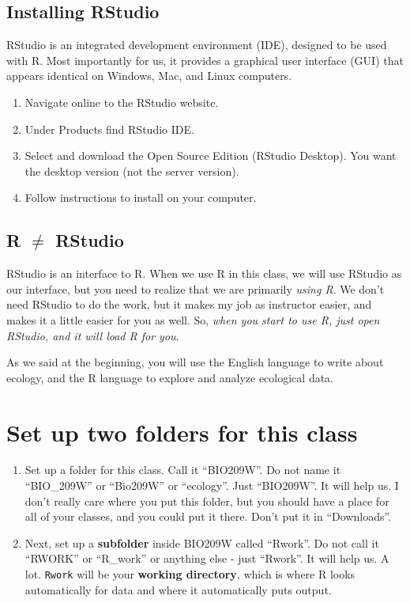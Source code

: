 \documentclass[
  letterpaper,
  DIV=11,
  numbers=noendperiod]{scrreprt}
\providecommand{\tightlist}{%
  \setlength{\itemsep}{0pt}\setlength{\parskip}{0pt}}
\begin{document}
\subsection{Installing RStudio}\label{installing-rstudio}

RStudio is an integrated development environment (IDE), designed to be
used with R. Most importantly for us, it provides a graphical user
interface (GUI) that appears identical on Windows, Mac, and Linux
computers.

\begin{enumerate}
\def\labelenumi{\arabic{enumi}.}
\tightlist
\item
  Navigate online to the RStudio website.
\item
  Under Products find RStudio IDE.
\item
  Select and download the Open Source Edition (RStudio Desktop). You
  want the desktop version (not the server version).
\item
  Follow instructions to install on your computer.
\end{enumerate}

\subsection{\texorpdfstring{R \(\neq\)
RStudio}{R \textbackslash neq RStudio}}\label{r-neq-rstudio}

RStudio is an interface to R. When we use R in this class, we will use
RStudio as our interface, but you need to realize that we are primarily
\emph{using R}. We don't need RStudio to do the work, but it makes my
job as instructor easier, and makes it a little easier for you as well.
So, \emph{when you start to use R, just open RStudio, and it will load R
for you}.

As we said at the beginning, you will use the English language to write
about ecology, and the R language to explore and analyze ecological
data.

\section{Set up two folders for this
class}\label{set-up-two-folders-for-this-class}

\begin{enumerate}
\def\labelenumi{\arabic{enumi}.}
\item
  Set up a folder for this class. Call it ``BIO209W''. Do not name it
  ``BIO\_209W'' or ``Bio209W'' or ``ecology''. Just ``BIO209W''. It will
  help us. I don't really care where you put this folder, but you should
  have a place for all of your classes, and you could put it there.
  Don't put it in ``Downloads''.
\item
  Next, set up a \textbf{subfolder} inside BIO209W called ``Rwork''. Do
  not call it ``RWORK'' or ``R\_work'' or anything else - just
  ``Rwork''. It will help us. A lot. \texttt{Rwork} will be your
  \textbf{working directory}, which is where R looks automatically for
  data and where it automatically puts output.
\end{enumerate}
\end{document}
